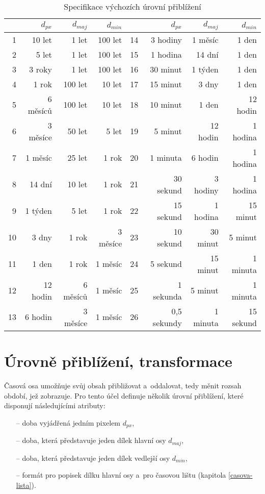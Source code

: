 	\begin{table}
			\small
			\centering
			\begin{tabular}{|r|r|rr||r|r|rr|}
				\hline
				 & $d_{px}$ & $d_{maj}$ & $d_{min}$ && $d_{px}$ & $d_{maj}$ & $d_{min}$ \\
				\hline
				1 & 10 let & 1\ts000 let & 100 let &
					14 & 3 hodiny & 1 měsíc & 1 den \\
				2 & 5 let & 1\ts000 let & 100 let &
					15 & 1 hodina & 14 dní & 1 den \\
				3 & 3 roky & 1\ts000 let & 100 let &
					16 & 30 minut & 1 týden & 1 den \\
				4 & 1 rok & 100 let & 10 let &
					17 & 15 minut & 3 dny & 1 den \\
				5 & 6 měsíců & 100 let & 10 let &
					18 & 10 minut & 1 den & 12 hodin \\
				6 & 3 měsíce & 50 let & 5 let &
					19 & 5 minut & 12 hodin & 1 hodina \\
				7 & 1 měsíc & 25 let & 1 rok &
					20 & 1 minuta & 6 hodin & 1 hodina \\
				8 & 14 dní & 10 let & 1 rok &
					21 & 30 sekund & 3 hodiny & 1 hodina \\
				9 & 1 týden & 5 let & 1 rok &
					22 & 15 sekund & 1 hodina & 15 minut \\
				10 & 3 dny & 1 rok & 3 měsíce &
					23 & 10 sekund & 30 minut & 5 minut \\
				11 & 1 den & 1 rok & 1 měsíc &
					24 & 5 sekund & 15 minut & 1 minuta \\
				12 & 12 hodin & 6 měsíců & 1 měsíc &
					25 & 1 sekunda & 5 minut & 1 minuta \\
				13 & 6 hodin & 3 měsíce & 1 měsíc &
					26 & 0,5 sekundy & 1 minuta & 15 sekund \\
				\hline
			\end{tabular}
			\caption{Specifikace výchozích úrovní přiblížení}
			\label{tab:urovne-priblizeni}
		\end{table}
	
	\section{Úrovně přiblížení, transformace}
		\label{urovne-priblizeni}
		Časová osa umožňuje svůj obsah přibližovat a~oddalovat, tedy měnit rozsah období, jež zobrazuje. Pro tento účel definuje několik úrovní přiblížení, které disponují následujícími atributy:
		\begin{itemize}
			\item[--] doba vyjádřená jedním pixelem $d_{px}$,
			\item[--] doba, která představuje jeden dílek hlavní osy $d_{maj}$,
			\item[--] doba, která představuje jeden dílek vedlejší osy $d_{min}$,
			\item[--] formát pro popisek dílku hlavní osy a~pro časovou lištu (kapitola \ref{casova-lista}).
		\end{itemize}
		
